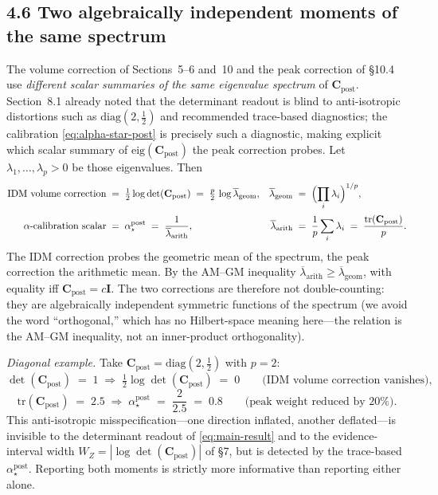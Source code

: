 \documentclass[11pt]{article}
\begin{document}
\subsection*{4.6 Two algebraically independent moments of the same spectrum}

The volume correction of Sections~5--6 and~10 and the peak correction of \S10.4 use
\emph{different scalar summaries of the same eigenvalue spectrum} of
$\mathbf C_{\mathrm{post}}$. Section~8.1 already noted that the determinant
readout is blind to anti-isotropic distortions such as
$\mathrm{diag}(2,\tfrac{1}{2})$ and recommended trace-based diagnostics; the
calibration \eqref{eq:alpha-star-post} is precisely such a diagnostic, making
explicit which scalar summary of $\mathrm{eig}(\mathbf C_{\mathrm{post}})$ the
peak correction probes. Let $\lambda_1,\ldots,\lambda_p > 0$ be those
eigenvalues. Then
\begin{align}
\text{IDM volume correction}
&\;=\;
\tfrac{1}{2}\log\det(\mathbf C_{\mathrm{post}})
\;=\;
\tfrac{p}{2}\,\log\overline\lambda_{\mathrm{geom}},
&
\overline\lambda_{\mathrm{geom}}
&\;=\;
\Bigl(\prod_i\lambda_i\Bigr)^{1/p},
\\[2pt]
\text{$\alpha$-calibration scalar}
&\;=\;
\alpha_\star^{\mathrm{post}}
\;=\;
\frac{1}{\overline\lambda_{\mathrm{arith}}},
&
\overline\lambda_{\mathrm{arith}}
&\;=\;
\frac{1}{p}\sum_i\lambda_i
\;=\;
\frac{\mathrm{tr}(\mathbf C_{\mathrm{post}})}{p}.
\end{align}
The IDM correction probes the geometric mean of the spectrum, the peak
correction the arithmetic mean. By the AM--GM inequality
$\overline\lambda_{\mathrm{arith}} \ge \overline\lambda_{\mathrm{geom}}$, with
equality iff $\mathbf C_{\mathrm{post}} = c\mathbf I$. The two corrections are
therefore not double-counting: they are algebraically independent symmetric
functions of the spectrum (we avoid the word ``orthogonal,'' which has no
Hilbert-space meaning here---the relation is the AM--GM inequality, not an
inner-product orthogonality).

\emph{Diagonal example.} Take $\mathbf C_{\mathrm{post}}
= \mathrm{diag}(2,\tfrac{1}{2})$ with $p = 2$:
\[
\det(\mathbf C_{\mathrm{post}}) \;=\; 1
\;\Rightarrow\;
\tfrac{1}{2}\log\det(\mathbf C_{\mathrm{post}}) \;=\; 0
\qquad\text{(IDM volume correction vanishes)},
\]
\[
\mathrm{tr}(\mathbf C_{\mathrm{post}}) \;=\; 2.5
\;\Rightarrow\;
\alpha_\star^{\mathrm{post}} \;=\; \frac{2}{2.5} \;=\; 0.8
\qquad\text{(peak weight reduced by 20\%)}.
\]
This anti-isotropic misspecification---one direction inflated, another
deflated---is invisible to the determinant readout of \eqref{eq:main-result}
and to the evidence-interval width
$W_Z = |\log\det(\mathbf C_{\mathrm{post}})|$ of \S7, but is detected by the
trace-based $\alpha_\star^{\mathrm{post}}$. Reporting both moments is strictly
more informative than reporting either alone.
\end{document}
